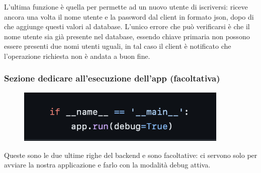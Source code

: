\documentclass{article}
\begin{document}
L’ultima funzione è quella per permette ad un nuovo utente di iscriversi: riceve ancora una volta il nome utente e la password dal client in formato json, dopo di che aggiunge questi valori al database.
L’unico errore che può verificarsi è che il nome utente sia già presente nel database, essendo chiave primaria non possono essere presenti due nomi utenti uguali, in tal caso il client è notificato che l’operazione richiesta non è andata a buon fine.

\subsubsection{Sezione dedicare all'esecuzione dell'app (facoltativa)}
\begin{figure}[H]
    \centering
    \includegraphics[width=0.9\textwidth]{images/esecuzione_app.png}
\end{figure}

Queste sono le due ultime righe del backend e sono facoltative: ci servono solo per avviare la nostra applicazione e farlo con la modalità debug attiva.
\end{document}
